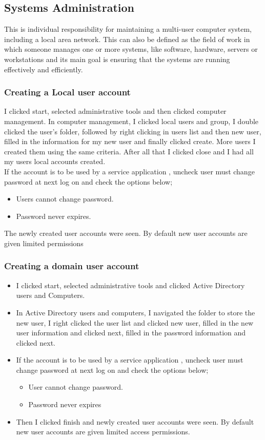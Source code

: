 \documentclass{article}
\begin{document}
\subsection{Systems Administration}
This is individual responsibility for maintaining a multi-user computer system, including a local
area network. This can also be defined as the field of work in which someone manages one or more systems, like software, hardware, servers or workstations and its main goal is ensuring that the systems are running effectively and efficiently.
\subsubsection{Creating a Local user account}
I clicked start, selected administrative tools and then clicked computer management. In computer management, I clicked local users and group, I double clicked the user's folder, followed by right clicking in users list and then new user, filled in the information for my new user and finally clicked create. More users I created them using the same criteria. After all that I clicked close and I had all my users local accounts created.\\
If the account is to be used by a service application , uncheck user must change password at next log on and check the options below;
\begin{itemize}
\item Users cannot change password.
\item Password never expires.
\end{itemize}
The newly created user accounts were seen. By default new user accounts are given limited permissions
\subsubsection{Creating a domain user account}
\begin{itemize}
\item I clicked start, selected administrative tools and clicked Active Directory users and Computers.
\item In Active Directory users and computers, I navigated the folder to store the new user, I right clicked the user list and clicked new user, filled in the new user information and clicked next, filled in the password information and clicked next.
\item If the account is to be used by a service application , uncheck user must change password at next log on and check the options below;
\begin{itemize}
\item User cannot change password.
\item Password never expires
\end{itemize}
\item Then I clicked finish and newly created user accounts were seen. By default new user accounts are given limited access permissions.
\end{itemize}
\end{document}
